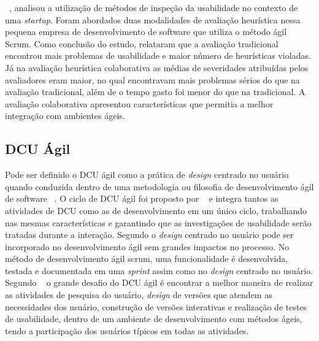 ~, analisou a utilização de métodos de inspeção da usabilidade no contexto de uma \textit{startup}. Foram abordados duas modalidades de avaliação heurística nessa pequena empresa de desenvolvimento de software que utiliza o método ágil Scrum. Como conclusão do estudo, relataram que a avaliação tradicional encontrou mais problemas de usabilidade e maior número de heurísticas violadas. Já na avaliação heurística colaborativa as médias de severidades atribuídas pelos avaliadores eram maior, no qual encontravam mais problemas sérios do que na avaliação tradicional, além de o tempo gasto foi menor do que na tradicional. A avaliação colaborativa apresentou características que permitia a melhor integração com ambientes ágeis.


\subsection{DCU Ágil}

Pode ser definido o DCU ágil como a prática de \emph{design} centrado no usuário quando conduzida dentro de uma metodologia ou filosofia de desenvolvimento ágil de software ~\cite{santos2012}.
%
O ciclo de DCU ágil foi proposto por ~ e integra tantos as atividades de DCU como as de desenvolvimento em um único ciclo, trabalhando nas mesmas características e garantindo que as investigações de usabilidade serão tratadas durante a interação.
%
Segundo  o \emph{design} centrado no usuário pode ser incorporado no desenvolvimento ágil sem grandes impactos no processo. No método de desenvolvimento ágil scrum, uma funcionalidade é desenvolvida, testada e documentada em uma \textit{sprint} assim como no \emph{design} centrado no usuário. 
%	
Segundo ~ o grande desafio do DCU ágil é encontrar a melhor maneira de realizar as atividades de pesquisa do usuário, \emph{design} de versões que atendem as necessidades dos usuário, construção de versões interativas e realização de testes de usabilidade, dentro de um ambiente de desenvolvimento com métodos ágeis, tendo a participação dos usuários típicos em todas as atividades.

